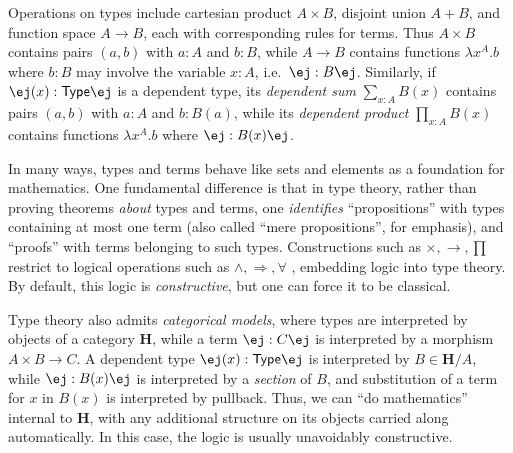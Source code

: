 \documentclass[copyright]{eptcs}
\makeatletter
\newcommand{\type}{\ensuremath{\mathsf{Type}}\xspace}
\renewcommand{\H}{\ensuremath{\mathbf{H}}\xspace}
\def\jd#1{\@jd#1\ej}
\def\@jd#1|-#2\ej{\@@jd#1,,\;\vdash\;\left(#2\right)}
\def\@@jd#1,{\@ifmtarg{#1}{\let\next=\relax}{\left(#1\right)\let\next=\@@@jd}\next}
\def\@@@jd#1,{\@ifmtarg{#1}{\let\next=\relax}{,\,\left(#1\right)\let\next=\@@@jd}\next}
\makeatother
\begin{document}
Operations on types include cartesian product $A\times B$, disjoint union $A+B$, and function space $A\to B$, each with corresponding rules for terms.
Thus $A\times B$ contains pairs $(a,b)$ with $a:A$ and $b:B$, while $A\to B$ contains functions $\lambda x^A.b$ where $b:B$ may involve the variable $x:A$, i.e.\ $\jd{x:A |- b:B}$.
%
%
Similarly, if $\jd{x:A |- B(x):\type}$ is a dependent type, its \emph{dependent sum} $\sum_{x:A} B(x)$ contains pairs $(a,b)$ with $a:A$ and $b:B(a)$, while its \emph{dependent product} $\prod_{x:A} B(x)$ contains functions $\lambda x^A .b$ where $\jd{x:A |- b : B(x)}$.

In many ways, types and terms behave like sets and elements as a foundation for mathematics.
One fundamental difference is that
in type theory, rather than proving theorems \emph{about} types and terms, one \emph{identifies}
``propositions'' with
types containing at most one term
(also called ``mere propositions'', for emphasis),
and ``proofs'' with terms belonging to such types.
Constructions such as $\times,\to,\prod$ restrict to logical operations such as $\wedge,\Rightarrow,\forall$%
, embedding logic into type theory.
By default, this logic is \emph{constructive}, but one can force it to be classical.

Type theory also admits \emph{categorical models}, where types are interpreted by objects of a category $\H$, while a term $\jd{x:A, y:B |- c:C}$ is interpreted by a morphism $A\times B\to C$.
A dependent type $\jd{x:A |- B(x):\type}$ is interpreted by $B\in\H/A$, while $\jd{x:A|- b:B(x)}$ is interpreted  by a \emph{section} of $B$, and substitution of a term for $x$ in $B(x)$ is interpreted by pullback.
Thus, we can ``do mathematics'' internal to \H, with any additional structure on its objects
carried along automatically.
In this case, the logic is usually unavoidably constructive.
\end{document}
